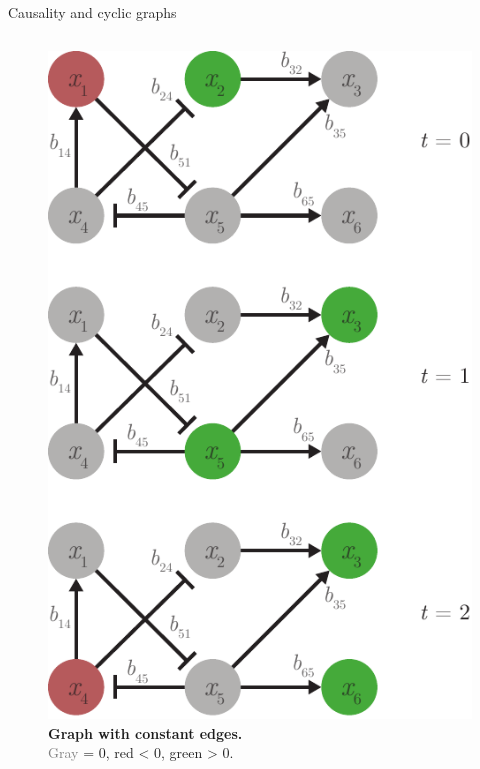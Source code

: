 \begin{frame}{Causality and cyclic graphs}
\begin{columns}
\begin{column}{0.35\textwidth}
\begin{figure}[ht]
    \includegraphics[width=.8\textwidth]{theory/fig/eberhardt.pdf}
    \caption{\textbf{Graph with constant edges.} \\ \textcolor{gray}{Gray} = 0, \textcolor{red!60!black}{red} < 0, \textcolor{green!45!black}{green} > 0.}
    \label{fig:eberhardt}
\end{figure}
\end{column}
\end{columns}
\end{frame}
